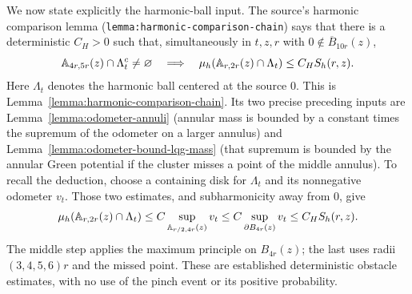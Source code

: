 \documentclass[12pt]{amsart}
\numberwithin{equation}{section}
\begin{document}
We now state explicitly the harmonic-ball input.
The source's harmonic comparison lemma
(\texttt{lemma:harmonic-comparison-chain}) says that
there is a deterministic $C_H>0$ such that, simultaneously
in $t,z,r$ with $0\notin\overline B_{10r}(z)$,
\begin{equation}\label{s11-pinch:eq:HB-constraint}
 \mathbb{A}_{4r,5r}(z)\cap\Lambda_t^c\ne\varnothing
 \quad\Longrightarrow\quad
 \mu_h(\mathbb{A}_{r,2r}(z)\cap\Lambda_t)\le C_H S_h(r,z).
\end{equation}
Here $\Lambda_t$ denotes the harmonic ball centered at the
source $0$. This is Lemma~\ref{lemma:harmonic-comparison-chain}. Its two precise preceding inputs are
Lemma~\ref{lemma:odometer-annuli} (annular mass is bounded by a constant times
the supremum of the odometer on a larger annulus) and
Lemma~\ref{lemma:odometer-bound-lqg-mass} (that supremum is bounded by the annular
Green potential if the cluster misses a point of the middle
annulus). To recall the deduction, choose a containing disk
for $\Lambda_t$ and its nonnegative odometer $v_t$.
Those two estimates, and subharmonicity away from $0$, give
\[
 \mu_h(\mathbb{A}_{r,2r}(z)\cap\Lambda_t)
 \le C\sup_{\mathbb{A}_{r/2,4r}(z)}v_t
 \le C\sup_{\partial B_{4r}(z)}v_t
 \le C_H S_h(r,z).
\]
The middle step applies the maximum principle on $B_{4r}(z)$;
the last uses radii $(3,4,5,6)r$ and the missed point.
These are established deterministic obstacle estimates, with
no use of the pinch event or its positive probability.
\end{document}
